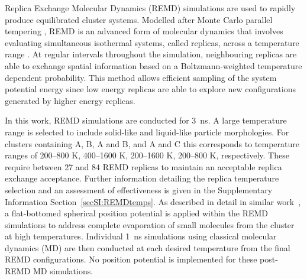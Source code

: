 Replica Exchange Molecular Dynamics (REMD) simulations are used to rapidly produce equilibrated cluster systems. Modelled after Monte Carlo parallel tempering \cite{Hukushima1996}, REMD is an advanced form of molecular dynamics that involves evaluating simultaneous isothermal systems, called replicas, across a temperature range \cite{Sugita1999}. At regular intervals throughout the simulation, neighbouring replicas are able to exchange spatial information based on a Boltzmann-weighted temperature dependent probability. This method allows efficient sampling of the system potential energy since low energy replicas are able to explore new configurations generated by higher energy replicas. 

In this work, REMD simulations are conducted for 3~ns. A large temperature range is selected to include solid-like and liquid-like particle morphologies. For clusters containing A, B, A and B, and A and C this corresponds to temperature ranges of 200--800 K, 400--1600 K, 200--1600 K, 200--800 K, respectively. These require between 27 and 84 REMD replicas to maintain an acceptable replica exchange acceptance. Further information detailing the replica temperature selection and an assessment of effectiveness is given in the Supplementary Information Section~\ref{secSI:REMDtemps}. As described in detail in similar work~\cite{bowal2018partitioning}, a flat-bottomed spherical position potential is applied within the REMD simulations to address complete evaporation of small molecules from the cluster at high temperatures. Individual 1~ns simulations using classical molecular dynamics (MD) are then conducted at each desired temperature from the final REMD configurations. No position potential is implemented for these post-REMD MD simulations.

